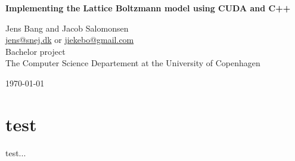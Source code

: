 \newcommand{\tit}{Implementing the Lattice Boltzmann model using CUDA and C++}
\newcommand{\aut}{Jens Bang and Jacob Salomonsen}
\newcommand{\subj}{Bachelor project}
\newcommand{\mail}{\href{mailto:jens@snej.dk}{jens@snej.dk} or \href{mailto:jiekebo@gmail.com}{jiekebo@gmail.com}}






\begin{titlepage}
\HRule
\begin{center}\huge{\bfseries{\tit}}\end{center}
\HRule
\begin{center}
\aut
\\[0.5cm]
\mail
\\[0.5cm]
\subj
\\[0.5cm]
The Computer Science Departement at the University of Copenhagen
\end{center}
\vfill
\begin{center}\today\end{center}
\end{titlepage}



\section{test}
test...

%
%


